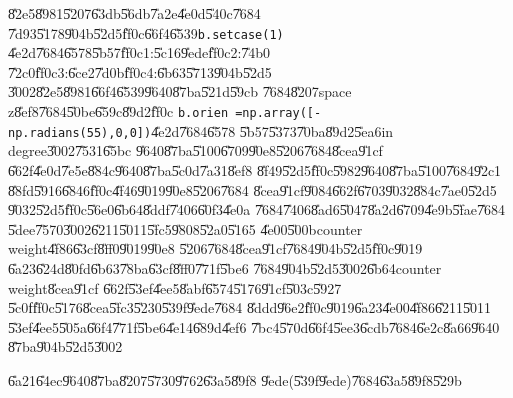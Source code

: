 \U{82e5}\U{8981}\U{5207}\U{63db}\U{56db}\U{7a2e}\U{4e0d}\U{540c}\U{7684}%
\U{7d93}\U{5178}\U{904b}\U{52d5}\U{ff0c}\U{66f4}\U{6539}\texttt{b.setcase(1)}%
\U{4e2d}\U{7684}\U{6578}\U{5b57}\U{ff0c}1:\U{5c16}\U{9ede}\U{ff0c}2:\U{74b0}%
\U{72c0}\U{ff0c}3:\U{6ce2}\U{7d0b}\U{ff0c}4:\U{6b63}\U{5713}\U{904b}\U{52d5}%
\U{3002}\U{82e5}\U{8981}\U{66f4}\U{6539}\U{9640}\U{87ba}\U{521d}\U{59cb}%
\U{7684}\U{8207}space z\U{8ef8}\U{7684}\U{50be}\U{659c}\U{89d2}\U{ff0c}%
\texttt{b.orien =np.array([-np.radians(55),0,0])}\U{4e2d}\U{7684}\U{6578}%
\U{5b57}\U{5373}\U{70ba}\U{89d2}\U{5ea6}in degree\U{3002}\U{7531}\U{65bc}%
\U{9640}\U{87ba}\U{5100}\U{6709}\U{90e8}\U{5206}\U{7684}\U{8cea}\U{91cf}%
\U{662f}\U{4e0d}\U{7e5e}\U{884c}\U{9640}\U{87ba}\U{5c0d}\U{7a31}\U{8ef8}%
\U{8f49}\U{52d5}\U{ff0c}\U{5982}\U{9640}\U{87ba}\U{5100}\U{7684}\U{92c1}%
\U{88fd}\U{5916}\U{6846}\U{ff0c}\U{4f46}\U{9019}\U{90e8}\U{5206}\U{7684}%
\U{8cea}\U{91cf}\U{9084}\U{662f}\U{6703}\U{9032}\U{884c}\U{7ae0}\U{52d5}%
\U{9032}\U{52d5}\U{ff0c}\U{56e0}\U{6b64}\U{8ddf}\U{7406}\U{60f3}\U{4e0a}%
\U{7684}\U{7406}\U{8ad6}\U{5047}\U{8a2d}\U{6709}\U{4e9b}\U{5fae}\U{7684}%
\U{5dee}\U{7570}\U{3002}\U{6211}\U{5011}\U{5fc5}\U{9808}\U{52a0}\U{5165}%
\U{4e00}\U{500b}counter weight\U{4f86}\U{63cf}\U{8ff0}\U{9019}\U{90e8}%
\U{5206}\U{7684}\U{8cea}\U{91cf}\U{7684}\U{904b}\U{52d5}\U{ff0c}\U{9019}%
\U{6a23}\U{624d}\U{80fd}\U{6b63}\U{78ba}\U{63cf}\U{8ff0}\U{771f}\U{5be6}%
\U{7684}\U{904b}\U{52d5}\U{3002}\U{6b64}counter weight\U{8cea}\U{91cf}%
\U{662f}\U{53ef}\U{4ee5}\U{8abf}\U{6574}\U{5176}\U{91cf}\U{503c}\U{5927}%
\U{5c0f}\U{ff0c}\U{5176}\U{8cea}\U{5fc3}\U{5230}\U{539f}\U{9ede}\U{7684}%
\U{8ddd}\U{96e2}\U{ff0c}\U{9019}\U{6a23}\U{4e00}\U{4f86}\U{6211}\U{5011}%
\U{53ef}\U{4ee5}\U{505a}\U{66f4}\U{771f}\U{5be6}\U{4e14}\U{689d}\U{4ef6}%
\U{7bc4}\U{570d}\U{66f4}\U{5ee3}\U{6cdb}\U{7684}\U{6e2c}\U{8a66}\U{9640}%
\U{87ba}\U{904b}\U{52d5}\U{3002}

\clearpage%

\begin{case}
\U{6a21}\U{64ec}\U{9640}\U{87ba}\U{8207}\U{5730}\U{9762}\U{63a5}\U{89f8}%
\U{9ede}(\U{539f}\U{9ede})\U{7684}\U{63a5}\U{89f8}\U{529b}
\end{case}

